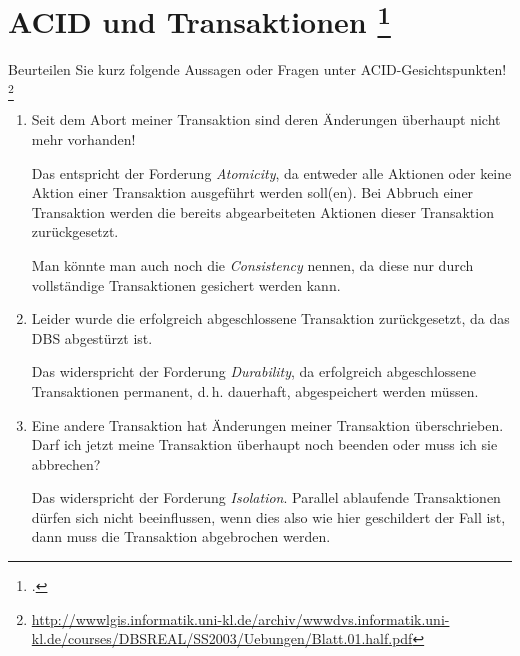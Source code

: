\documentclass{lehramt-informatik-aufgabe}
\begin{document}

\section{ACID und Transaktionen
\footcite{db:ab:6}}

Beurteilen Sie kurz folgende Aussagen oder Fragen unter
ACID-Gesichtspunkten!
\footnote{\url{http://wwwlgis.informatik.uni-kl.de/archiv/wwwdvs.informatik.uni-kl.de/courses/DBSREAL/SS2003/Uebungen/Blatt.01.half.pdf}}
\begin{enumerate}


\item Seit dem Abort meiner Transaktion sind deren Änderungen überhaupt
nicht mehr vorhanden!

\begin{liAntwort}
Das entspricht der Forderung \emph{Atomicity}, da entweder alle Aktionen
oder keine Aktion einer Transaktion ausgeführt werden soll(en). Bei
Abbruch einer Transaktion werden die bereits abgearbeiteten Aktionen
dieser Transaktion zurückgesetzt.

Man könnte man auch noch die \emph{Consistency} nennen, da diese nur
durch vollständige Transaktionen gesichert werden kann.
\end{liAntwort}


\item Leider wurde die erfolgreich abgeschlossene Transaktion
zurückgesetzt, da das DBS abgestürzt ist.

\begin{liAntwort}
Das widerspricht der Forderung \emph{Durability}, da erfolgreich
abgeschlossene Transaktionen permanent, d.\,h. dauerhaft, abgespeichert
werden müssen.
\end{liAntwort}


\item Eine andere Transaktion hat Änderungen meiner Transaktion
überschrieben. Darf ich jetzt meine Transaktion überhaupt noch beenden
oder muss ich sie abbrechen?

\begin{liAntwort}
Das widerspricht der Forderung \emph{Isolation}. Parallel ablaufende
Transaktionen dürfen sich nicht beeinflussen, wenn dies also wie hier
geschildert der Fall ist, dann muss die Transaktion abgebrochen werden.
\end{liAntwort}

\end{enumerate}
\end{document}
